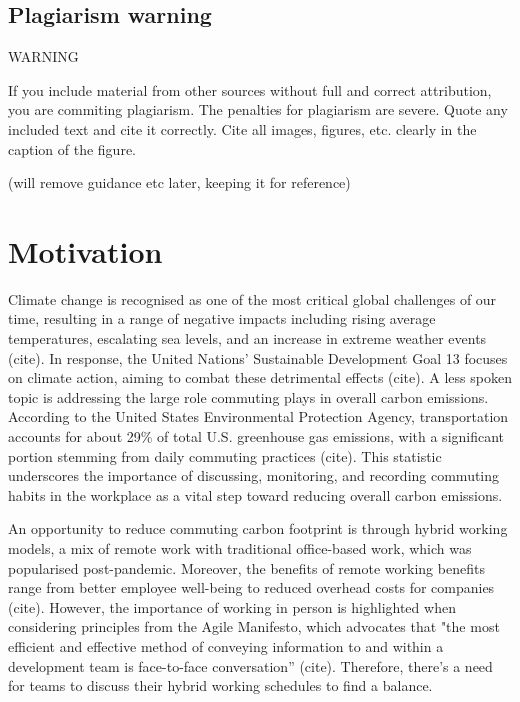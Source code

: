 \documentclass{l4proj}
\begin{document}
\subsection{Plagiarism warning}

\begin{highlight_title}{WARNING}
    
    If you include material from other sources without full and correct attribution, you are commiting plagiarism. The penalties for plagiarism are severe.
    Quote any included text and cite it correctly. Cite all images, figures, etc. clearly in the caption of the figure.
\end{highlight_title}


(will remove guidance etc later, keeping it for reference)


\section{Motivation}

Climate change is recognised as one of the most critical global challenges of our time, resulting in a range of negative impacts including rising average temperatures, escalating sea levels, and an increase in extreme weather events (cite). In response, the United Nations' Sustainable Development Goal 13 focuses on climate action, aiming to combat these detrimental effects (cite). A less spoken topic is addressing the large role commuting plays in overall carbon emissions. According to the United States Environmental Protection Agency, transportation accounts for about 29\% of total U.S. greenhouse gas emissions, with a significant portion stemming from daily commuting practices (cite). This statistic underscores the importance of discussing, monitoring, and recording commuting habits in the workplace as a vital step toward reducing overall carbon emissions.

An opportunity to reduce commuting carbon footprint is through hybrid working models, a mix of remote work with traditional office-based work, which was popularised post-pandemic. Moreover, the benefits of remote working benefits range from better employee well-being to reduced overhead costs for companies (cite). However, the importance of working in person is highlighted when considering principles from the Agile Manifesto, which advocates that "the most efficient and effective method of conveying information to and within a development team is face-to-face conversation” (cite). Therefore, there’s a need for teams to discuss their hybrid working schedules to find a balance.
\end{document}

